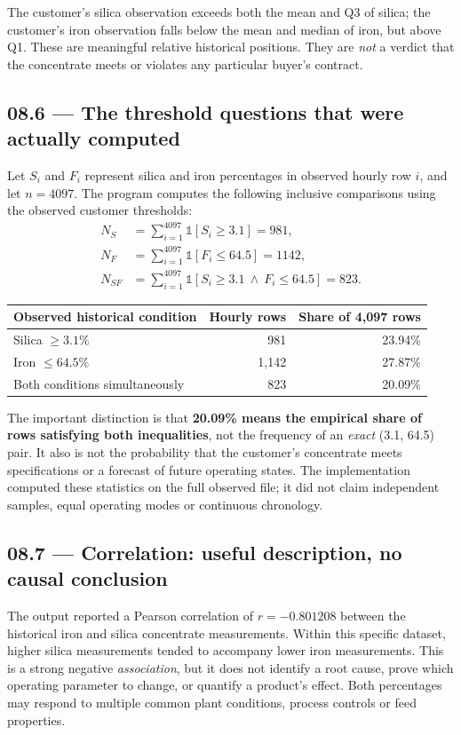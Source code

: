 \documentclass[11pt,a4paper]{article}
\begin{document}
The customer's silica observation exceeds both the mean and Q3 of silica; the customer's iron observation falls below the mean and median of iron, but above Q1. These are meaningful relative historical positions. They are \emph{not} a verdict that the concentrate meets or violates any particular buyer's contract.

\subsection{08.6 --- The threshold questions that were actually computed}
Let $S_i$ and $F_i$ represent silica and iron percentages in observed hourly row $i$, and let $n=4097$. The program computes the following inclusive comparisons using the observed customer thresholds:
\begin{align}
N_S &= \sum_{i=1}^{4097} \mathbb{1}[S_i \geq 3.1] = 981,\\
N_F &= \sum_{i=1}^{4097} \mathbb{1}[F_i \leq 64.5] = 1142,\\
N_{SF} &= \sum_{i=1}^{4097} \mathbb{1}[S_i \geq 3.1\ \land\ F_i \leq 64.5] = 823.
\end{align}
\begin{tabularx}{\textwidth}{@{}Y r r@{}}
\toprule
\textbf{Observed historical condition} & \textbf{Hourly rows} & \textbf{Share of 4,097 rows}\\\midrule
Silica $\geq 3.1\%$ & 981 & 23.94\%\\
Iron $\leq 64.5\%$ & 1,142 & 27.87\%\\
Both conditions simultaneously & 823 & 20.09\%\\\bottomrule
\end{tabularx}

The important distinction is that \textbf{20.09\% means the empirical share of rows satisfying both inequalities}, not the frequency of an \emph{exact} (3.1, 64.5) pair. It also is not the probability that the customer's concentrate meets specifications or a forecast of future operating states. The implementation computed these statistics on the full observed file; it did not claim independent samples, equal operating modes or continuous chronology.

\subsection{08.7 --- Correlation: useful description, no causal conclusion}
The output reported a Pearson correlation of \textbf{$r=-0.801208$} between the historical iron and silica concentrate measurements. Within this specific dataset, higher silica measurements tended to accompany lower iron measurements. This is a strong negative \emph{association}, but it does not identify a root cause, prove which operating parameter to change, or quantify a product's effect. Both percentages may respond to multiple common plant conditions, process controls or feed properties.
\end{document}
